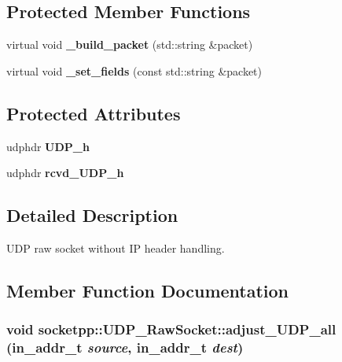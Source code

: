\subsection*{Protected Member Functions}
\begin{CompactItemize}
\item 
\hypertarget{classsocketpp_1_1UDP__RawSocket_fe8cc7391c23dcf011f285b1605cad6b}{
virtual void \textbf{\_\-build\_\-packet} (std::string \&packet)}
\label{classsocketpp_1_1UDP__RawSocket_fe8cc7391c23dcf011f285b1605cad6b}

\item 
\hypertarget{classsocketpp_1_1UDP__RawSocket_a2dd7ab190a6730f9272eced4e648b50}{
virtual void \textbf{\_\-set\_\-fields} (const std::string \&packet)}
\label{classsocketpp_1_1UDP__RawSocket_a2dd7ab190a6730f9272eced4e648b50}

\end{CompactItemize}
\subsection*{Protected Attributes}
\begin{CompactItemize}
\item 
\hypertarget{classsocketpp_1_1UDP__RawSocket_fbdcc519279aec772f575237ca25f783}{
udphdr \textbf{UDP\_\-h}}
\label{classsocketpp_1_1UDP__RawSocket_fbdcc519279aec772f575237ca25f783}

\item 
\hypertarget{classsocketpp_1_1UDP__RawSocket_9b21e1b520434f7b07d5afcc35ceb76c}{
udphdr \textbf{rcvd\_\-UDP\_\-h}}
\label{classsocketpp_1_1UDP__RawSocket_9b21e1b520434f7b07d5afcc35ceb76c}

\end{CompactItemize}


\subsection{Detailed Description}
UDP raw socket without IP header handling. 

\subsection{Member Function Documentation}
\hypertarget{classsocketpp_1_1UDP__RawSocket_4fe2e6b184ca8f8248a187df30e12fd2}{
\subsubsection[{adjust\_\-UDP\_\-all}]{\setlength{\rightskip}{0pt plus 5cm}void socketpp::UDP\_\-RawSocket::adjust\_\-UDP\_\-all (in\_\-addr\_\-t {\em source}, \/  in\_\-addr\_\-t {\em dest})}}
\label{classsocketpp_1_1UDP__RawSocket_4fe2e6b184ca8f8248a187df30e12fd2}


